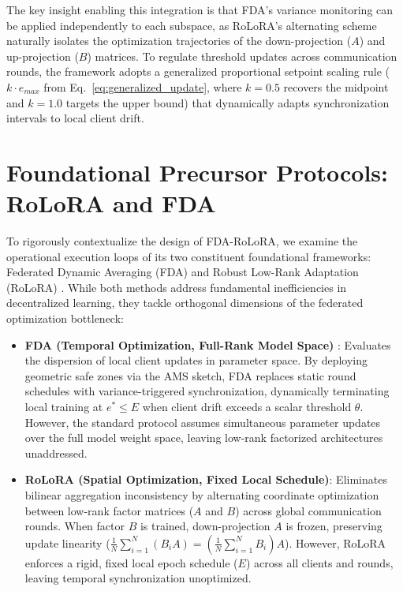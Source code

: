 The key insight enabling this integration is that FDA's variance monitoring can be applied independently to each subspace, as RoLoRA's alternating scheme naturally isolates the optimization trajectories of the down-projection ($A$) and up-projection ($B$) matrices. To regulate threshold updates across communication rounds, the framework adopts a generalized proportional setpoint scaling rule ($k \cdot e_{max}$ from Eq.~\ref{eq:generalized_update}, where $k=0.5$ recovers the midpoint and $k=1.0$ targets the upper bound) that dynamically adapts synchronization intervals to local client drift.

\section{Foundational Precursor Protocols: RoLoRA and FDA}
\label{sec:foundational_protocols}

To rigorously contextualize the design of FDA-RoLoRA, we examine the operational execution loops of its two constituent foundational frameworks: Federated Dynamic Averaging (FDA) \cite{theologitis2025communication} and Robust Low-Rank Adaptation (RoLoRA) \cite{chen2025robust}. While both methods address fundamental inefficiencies in decentralized learning, they tackle orthogonal dimensions of the federated optimization bottleneck:

\begin{itemize}
    \item \textbf{FDA (Temporal Optimization, Full-Rank Model Space)} \cite{theologitis2025communication}: Evaluates the dispersion of local client updates in parameter space. By deploying geometric safe zones via the AMS sketch, FDA replaces static round schedules with variance-triggered synchronization, dynamically terminating local training at $e^* \le E$ when client drift exceeds a scalar threshold $\theta$. However, the standard protocol assumes simultaneous parameter updates over the full model weight space, leaving low-rank factorized architectures unaddressed.
    \item \textbf{RoLoRA (Spatial Optimization, Fixed Local Schedule)}: Eliminates bilinear aggregation inconsistency by alternating coordinate optimization between low-rank factor matrices ($A$ and $B$) across global communication rounds. When factor $B$ is trained, down-projection $A$ is frozen, preserving update linearity ($\frac{1}{N}\sum_{i=1}^{N} (B_i A) = \left(\frac{1}{N}\sum_{i=1}^{N} B_i\right) A$). However, RoLoRA enforces a rigid, fixed local epoch schedule ($E$) across all clients and rounds, leaving temporal synchronization unoptimized.
\end{itemize}

